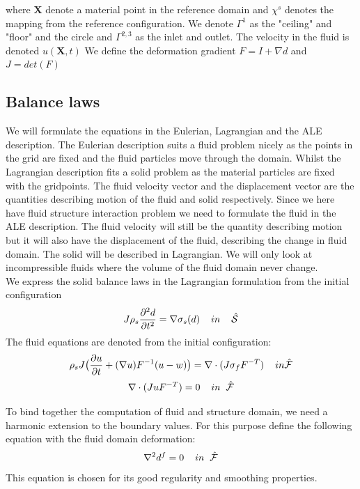 where $\textbf{X}$ denote a material point in the reference domain and $\chi^s$ denotes the mapping from the reference configuration.
We denote $\Gamma^1$ as the "ceiling" and "floor" and the circle and $\Gamma^{2,3}$ as the inlet and outlet.
The velocity in the fluid is denoted $u(\textbf{X},t)$
We define the deformation gradient $F = I + \nabla d$ and $J = det(F)$
\subsection*{Balance laws}
We will formulate the equations in the Eulerian, Lagrangian and the ALE description.
The Eulerian description suits a fluid problem nicely as the points in the grid are fixed and the fluid particles move through the domain. Whilst the Lagrangian description fits a solid problem as the material particles are fixed with the gridpoints. The fluid velocity vector and the displacement vector are the quantities describing motion of the fluid and solid respectively. Since we here have fluid structure interaction problem we need to formulate the fluid in the ALE description. The fluid velocity will still be the quantity describing motion but it will also have the displacement of the fluid, describing the change in fluid domain. The solid will be described in Lagrangian. We will only look at incompressible fluids where the volume of the fluid domain never change.\\
We express the solid balance laws in the Lagrangian formulation from the initial configuration
$$J\rho_s \frac{\partial^2 d}{\partial t^2} = \nabla \sigma_s(d) \hspace{4mm}in\hspace{4mm} \mathcal{\hat{S}} $$
The fluid equations are denoted from the initial configuration:
$$ \rho_s J \big( \frac{\partial u}{\partial t} + (\nabla u)F^{-1}(u-w)\big) = \nabla \cdot (J\sigma_f F^{-T} )\hspace{4mm} in \mathcal{\hat{F}}$$
$$ \nabla \cdot (J u F^{-T}) = 0 \hspace{4mm} in \hspace{2mm} \mathcal{\hat{F}}$$

To bind together the computation of fluid and structure domain, we need a harmonic extension to the boundary values. For this purpose define the following equation with the fluid domain deformation:
$$ \nabla^2 d^f = 0\hspace{4mm}in \hspace{2mm} \mathcal{\hat{F}}$$
This equation is chosen for its good regularity and smoothing properties.

